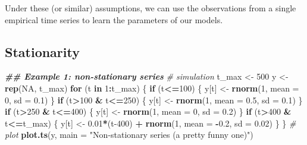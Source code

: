 \documentclass[
]{book}
\newenvironment{Shaded}{\begin{snugshade}}{\end{snugshade}}
\newcommand{\AttributeTok}[1]{\textcolor[rgb]{0.13,0.29,0.53}{#1}}
\newcommand{\CommentTok}[1]{\textcolor[rgb]{0.56,0.35,0.01}{\textit{#1}}}
\newcommand{\ConstantTok}[1]{\textcolor[rgb]{0.56,0.35,0.01}{#1}}
\newcommand{\ControlFlowTok}[1]{\textcolor[rgb]{0.13,0.29,0.53}{\textbf{#1}}}
\newcommand{\DecValTok}[1]{\textcolor[rgb]{0.00,0.00,0.81}{#1}}
\newcommand{\DocumentationTok}[1]{\textcolor[rgb]{0.56,0.35,0.01}{\textbf{\textit{#1}}}}
\newcommand{\FloatTok}[1]{\textcolor[rgb]{0.00,0.00,0.81}{#1}}
\newcommand{\FunctionTok}[1]{\textcolor[rgb]{0.13,0.29,0.53}{\textbf{#1}}}
\newcommand{\NormalTok}[1]{#1}
\newcommand{\OtherTok}[1]{\textcolor[rgb]{0.56,0.35,0.01}{#1}}
\newcommand{\SpecialCharTok}[1]{\textcolor[rgb]{0.81,0.36,0.00}{\textbf{#1}}}
\newcommand{\StringTok}[1]{\textcolor[rgb]{0.31,0.60,0.02}{#1}}
\begin{document}
Under these (or similar) assumptions, we can use the observations from a single empirical time series to learn the parameters of our models.

\hypertarget{stationarity}{%
\subsection*{Stationarity}\label{stationarity}}

\begin{Shaded}
\begin{Highlighting}[]
\DocumentationTok{\#\# Example 1: non{-}stationary series}
\CommentTok{\# simulation}
\NormalTok{t\_max }\OtherTok{\textless{}{-}} \DecValTok{500}
\NormalTok{y }\OtherTok{\textless{}{-}} \FunctionTok{rep}\NormalTok{(}\ConstantTok{NA}\NormalTok{, t\_max)}
\ControlFlowTok{for}\NormalTok{ (t }\ControlFlowTok{in} \DecValTok{1}\SpecialCharTok{:}\NormalTok{t\_max) \{}
  \ControlFlowTok{if}\NormalTok{ (t}\SpecialCharTok{\textless{}=}\DecValTok{100}\NormalTok{) \{}
\NormalTok{    y[t] }\OtherTok{\textless{}{-}} \FunctionTok{rnorm}\NormalTok{(}\DecValTok{1}\NormalTok{, }\AttributeTok{mean =} \DecValTok{0}\NormalTok{, }\AttributeTok{sd =} \FloatTok{0.1}\NormalTok{)}
\NormalTok{  \}}
  \ControlFlowTok{if}\NormalTok{ (t}\SpecialCharTok{\textgreater{}}\DecValTok{100} \SpecialCharTok{\&}\NormalTok{ t}\SpecialCharTok{\textless{}=}\DecValTok{250}\NormalTok{) \{}
\NormalTok{    y[t] }\OtherTok{\textless{}{-}} \FunctionTok{rnorm}\NormalTok{(}\DecValTok{1}\NormalTok{, }\AttributeTok{mean =} \FloatTok{0.5}\NormalTok{, }\AttributeTok{sd =} \FloatTok{0.1}\NormalTok{)}
\NormalTok{  \}}
  \ControlFlowTok{if}\NormalTok{ (t}\SpecialCharTok{\textgreater{}}\DecValTok{250} \SpecialCharTok{\&}\NormalTok{ t}\SpecialCharTok{\textless{}=}\DecValTok{400}\NormalTok{) \{}
\NormalTok{    y[t] }\OtherTok{\textless{}{-}} \FunctionTok{rnorm}\NormalTok{(}\DecValTok{1}\NormalTok{, }\AttributeTok{mean =} \DecValTok{0}\NormalTok{, }\AttributeTok{sd =} \FloatTok{0.2}\NormalTok{)}
\NormalTok{  \}}
  \ControlFlowTok{if}\NormalTok{ (t}\SpecialCharTok{\textgreater{}}\DecValTok{400} \SpecialCharTok{\&}\NormalTok{ t}\SpecialCharTok{\textless{}=}\NormalTok{t\_max) \{}
\NormalTok{    y[t] }\OtherTok{\textless{}{-}} \FloatTok{0.01}\SpecialCharTok{*}\NormalTok{(t}\DecValTok{{-}400}\NormalTok{) }\SpecialCharTok{+} \FunctionTok{rnorm}\NormalTok{(}\DecValTok{1}\NormalTok{, }\AttributeTok{mean =} \SpecialCharTok{{-}}\FloatTok{0.2}\NormalTok{, }\AttributeTok{sd =} \FloatTok{0.02}\NormalTok{)}
\NormalTok{  \}}
\NormalTok{\}}
\CommentTok{\# plot}
\FunctionTok{plot.ts}\NormalTok{(y, }\AttributeTok{main =} \StringTok{"Non{-}stationary series (a pretty funny one)"}\NormalTok{)}
\end{Highlighting}
\end{Shaded}
\end{document}
